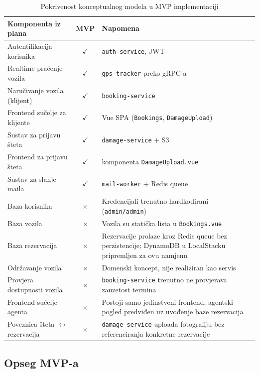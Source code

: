\documentclass[12pt,a4paper]{article}
\begin{document}
\begin{table}[H]
\centering
\caption{Pokrivenost konceptualnog modela u MVP implementaciji}
\label{tab:pokrivenost}
\begin{tabularx}{\textwidth}{l c X}
\toprule
\textbf{Komponenta iz plana} & \textbf{MVP} & \textbf{Napomena} \\
\midrule
Autentifikacija korisnika      & $\checkmark$ & \texttt{auth-service}, JWT \\
Realtime praćenje vozila       & $\checkmark$ & \texttt{gps-tracker} preko gRPC-a \\
Naručivanje vozila (klijent)   & $\checkmark$ & \texttt{booking-service} \\
Frontend sučelje za klijente   & $\checkmark$ & Vue SPA (\texttt{Bookings}, \texttt{DamageUpload}) \\
Sustav za prijavu šteta        & $\checkmark$ & \texttt{damage-service} + S3 \\
Frontend za prijavu šteta      & $\checkmark$ & komponenta \texttt{DamageUpload.vue} \\
Sustav za slanje maila         & $\checkmark$ & \texttt{mail-worker} + Redis queue \\
\midrule
Baza korisnika                 & $\times$ & Kredencijali trenutno hardkodirani (\texttt{admin/admin}) \\
Baza vozila                    & $\times$ & Vozila su statička lista u \texttt{Bookings.vue} \\
Baza rezervacija               & $\times$ & Rezervacije prolaze kroz Redis queue bez perzistencije; DynamoDB u LocalStacku pripremljen za ovu namjenu \\
Održavanje vozila              & $\times$ & Domenski koncept, nije realiziran kao servis \\
Provjera dostupnosti vozila    & $\times$ & \texttt{booking-service} trenutno ne provjerava zauzetost termina \\
Frontend sučelje agenta        & $\times$ & Postoji samo jedinstveni frontend; agentski pogled predviđen uz uvođenje baze rezervacija \\
Poveznica šteta $\leftrightarrow$ rezervacija & $\times$ & \texttt{damage-service} uploada fotografiju bez referenciranja konkretne rezervacije \\
\bottomrule
\end{tabularx}
\end{table}

\subsection{Opseg MVP-a}
\end{document}
